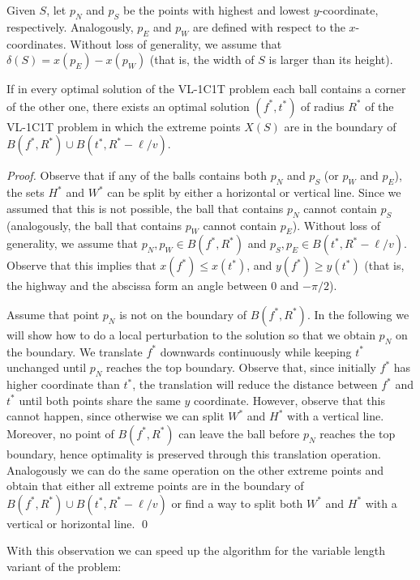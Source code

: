 \documentclass{llncs}
\newcommand{\x}[1]{x({#1})}
\newcommand{\y}[1]{y({#1})}
\newcommand{\ball}[1]{B({#1})}
\begin{document}
Given $S$, let $p_N$ and $p_S$ be the points with highest and lowest $y$-coordinate, respectively. Analogously, $p_E$ and $p_W$ are defined with respect to the $x$-coordinates.
Without loss of generality, we assume that $\delta(S)=\x{p_E}-\x{p_W}$ (that is, the width of $S$ is larger than its height).


\begin{lemma}\label{lemma:corner}
If in every optimal solution of the VL-1C1T problem each ball contains a corner of the other one, there exists an optimal solution $(f^*,t^*)$ of radius $R^*$ of the VL-1C1T problem in which the extreme points $X(S)$ are in the boundary of $\ball{f^*,R^*} \cup \ball{t^*,R^*-\ell/v}$.
\end{lemma}
\begin{proof}
Observe that if any of the balls contains both $p_N$ and $p_S$ (or $p_W$ and $p_E$), the sets $H^*$ and $W^*$ can be split by either a horizontal or vertical line. Since we assumed that this is not possible, the ball that contains $p_N$ cannot contain $p_S$ (analogously, the ball that contains $p_W$ cannot contain $p_E$). Without loss of generality, we assume that $p_N,p_W \in\ball{f^*,R^*}$ and $p_S,p_E\in\ball{t^*,R^*-\ell/v}$. Observe that this implies that $\x{f^*}\leq\x{t^*}$, and $\y{f^*}\geq\y{t^*}$ (that is, the highway and the abscissa form an angle between $0$ and $-\pi/2$).

Assume that point $p_N$ is not on the boundary of $\ball{f^*,R^*}$. In the following we will show how to do a local perturbation to the solution so that we obtain $p_N$ on the boundary. We translate $f^*$ downwards continuously while keeping $t^*$ unchanged  until $p_N$ reaches the top boundary. Observe that, since initially $f^*$ has higher coordinate than $t^*$, the translation will reduce the distance between $f^*$ and $t^*$ until both points share the same $y$ coordinate. However, observe that this cannot happen, since otherwise we can split $W^*$ and $H^*$ with a vertical line. Moreover, no point of $\ball{f^*,R^*}$ can leave the ball before $p_N$ reaches the top boundary, hence optimality is preserved through this translation operation. Analogously we can do the same operation on the other extreme points and obtain that either all extreme points are in the boundary of  $\ball{f^*,R^*} \cup \ball{t^*,R^*-\ell/v}$ or find a way to split both $W^*$ and $H^*$ with a vertical or horizontal line. \qed
\end{proof}

With this observation we can speed up the algorithm for the variable length variant of the problem:
\end{document}
